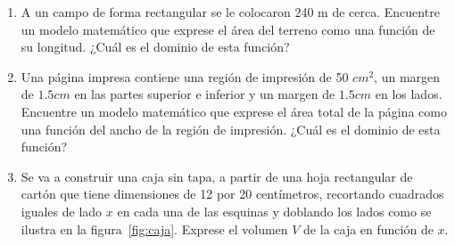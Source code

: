 \begin{prob}
\begin{enumerate}
\item A un campo de forma rectangular se le colocaron 240 m de cerca. Encuentre un modelo matemático que exprese el área del terreno como una función de su longitud. ¿Cuál es el dominio de esta función?

\item Una página impresa contiene una región de impresión de 50 \(cm^2\), un margen de $1.5 cm$  en las partes superior e inferior y un margen de  $1.5 cm$ en los lados. Encuentre un modelo matemático que exprese el área total de la página como una función del ancho de la región de impresión. ¿Cuál es el dominio de esta función?

\item Se va a construir una caja sin tapa, a partir de una hoja rectangular de cartón que tiene dimensiones de 12 por 20 centímetros, recortando cuadrados iguales de lado \(x\) en cada una de las esquinas y doblando los lados como se ilustra en la figura~\ref{fig:caja}. Exprese el volumen \(V\) de la caja en función de \(x\).

\begin{figure}[!htbp]
\centering
{}
\end{figure}
\end{enumerate}
\end{prob}
